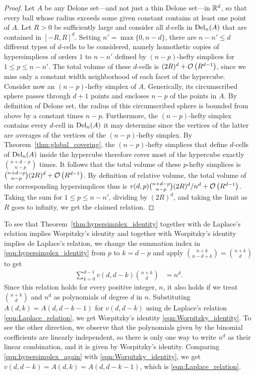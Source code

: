 \documentclass[a4paper,UKenglish,cleveref, autoref,numberwithinsect]{socg-lipics-v2021}
\newcommand {\mm}[1] {\ifmmode{#1}\else{\mbox{\(#1\)}}\fi}
\theoremstyle{plain}
\newcommand{\Rspace}        {\mm{{\mathbb R}}}
\newcommand{\Delaunay}[2]   {\mm{{\rm Del}_{#1}{({#2})}}}
\newcommand{\bigOh}[1]      {\mm{\mathcal{O}\left({#1}\right)}}
\begin{document}
\begin{proof}
  Let $A$ be any Delone set---and not just a thin Delone set---in $\Rspace^d$, so that every ball whose radius exceeds some given constant contains at least one point of $A$.
  Let $R > 0$ be sufficiently large and consider all $d$-cells in $\Delaunay{n}{A}$ that are contained in $[-R,R]^d$.
  Setting $n' = \max \{ 0, n-d \}$, there are $n-n' \leq d$ different types of $d$-cells to be considered, namely homothetic copies of hypersimplices of orders $1$ to $n-n'$ defined by $(n-p)$-hefty simplices for $1 \leq p \leq n-n'$.
  The total volume of these $d$-cells is $(2R)^d + \bigOh{R^{d-1}}$, since we miss only a constant width neighborhood of each facet of the hypercube.
  \smallskip
  Consider now an $(n-p)$-hefty simplex of $A$.
  Generically, its circumscribed sphere passes through $d+1$ points and encloses $n-p$ of the points in $A$.
  By definition of Delone set, the radius of this circumscribed sphere is bounded from above by a constant times $n-p$.
  Furthermore, the $(n-p)$-hefty simplex contains every $d$-cell in $\Delaunay{n}{A}$ it may determine since the vertices of the latter are averages of the vertices of the $(n-p)$-hefty simplex.
  By Theorem~\ref{thm:global_covering}, the $(n-p)$-hefty simplices that define $d$-cells of $\Delaunay{n}{A}$ inside the hypercube therefore cover most of the hypercube exactly $\binom{n+d-p}{n-p}$ times.
  It follows that the total volume of these $p$-hefty simplices is $\binom{n+d-p}{n-p} (2R)^d + \bigOh{R^{d-1}}$.
  By definition of relative volume, the total volume of the corresponding hypersimplices thus is ${v(d,p)} \binom{n+d-p}{n-p} (2R)^d / n^d + \bigOh{R^{d-1}}$.
  Taking the sum for $1 \leq p \leq n-n'$, dividing by $(2R)^d$, and taking the limit as $R$ goes to infinity, we get the claimed relation.
\end{proof}
To see that Theorem~\ref{thm:hypersimplex_identity} together with de Laplace's relation implies Worpitzky's identity and together with Worpitzky's identity implies de Laplace's relation, we change the summation index in \eqref{eqn:hypersimplex_identity} from $p$ to $k=d-p$ and apply $\binom{n+k}{n-d+k} = \binom{n+k}{d}$ to get
\begin{align}
  \sum\nolimits_{k=0}^{d-1} v(d,d-k) \binom{n+k}{d} &= n^d .
  \label{eqn:hypersimplex_again}
\end{align}
Since this relation holds for every positive integer, $n$, it also holds if we treat $\binom{n+k}{d}$ and $n^d$ as polynomials of degree $d$ in $n$.
Substituting $A(d,k) = A(d,d-k-1)$ for $v(d,d-k)$ using de Laplace's relation \eqref{eqn:Laplace_relation}, we get Worpitzky's identity \eqref{eqn:Worpitzky_identity}.
To see the other direction, we observe that the polynomials given by the binomial coefficients are linearly independent, so there is only one way to write $n^d$ as their linear combination, and it is given by Worpitzky's identity.
Comparing \eqref{eqn:hypersimplex_again} with \eqref{eqn:Worpitzky_identity}, we get $v(d,d-k) = A(d,k) = A(d,d-k-1)$, which is \eqref{eqn:Laplace_relation}.
\end{document}
